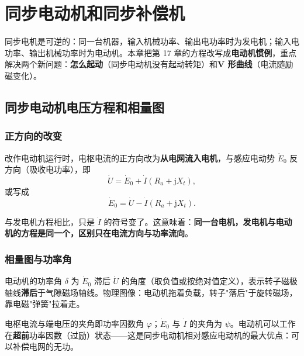\chapter{同步电动机和同步补偿机}

同步电机是可逆的：同一台机器，输入机械功率、输出电功率时为发电机；输入电功率、输出机械功率时为电动机。本章把第 17 章的方程改写成\textbf{电动机惯例}，重点解决两个新问题：\textbf{怎么起动}（同步电动机没有起动转矩）和\textbf{V 形曲线}（电流随励磁变化）。

\section{同步电动机电压方程和相量图}

\subsection{正方向的改变}
改作电动机运行时，电枢电流的正方向改为\textbf{从电网流入电机}，与感应电动势 $\dot E_0$ 反方向（吸收电功率），即
\begin{equation}
\dot U=\dot E_0+\dot I\left(R_a+\mathrm{j}X_t\right),
\end{equation}
或写成
\begin{equation}
\dot E_0=\dot U-\dot I\left(R_a+\mathrm{j}X_t\right).
\end{equation}


与发电机方程相比，只是 $\dot I$ 的符号变了。这意味着：\textbf{同一台电机，发电机与电动机的方程是同一个，区别只在电流方向与功率流向}。

\subsection{相量图与功率角}
电动机的功率角 $\delta$ 为 $\dot E_0$ 滞后 $\dot U$ 的角度（取负值或按绝对值定义），表示转子磁极轴线\textbf{滞后}于气隙磁场轴线。物理图像：电动机拖着负载，转子"落后"于旋转磁场，靠电磁"弹簧"拉着走。

电枢电流与端电压的夹角即功率因数角 $\varphi$；$\dot E_0$ 与 $\dot I$ 的夹角为 $\psi$。电动机可以工作在\textbf{超前}功率因数（过励）状态——这是同步电动机相对感应电动机的最大优点：可以补偿电网的无功。

